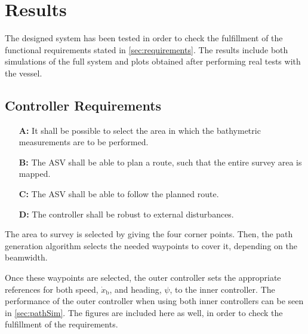 \chapter{Results}\label{chap:results}
The designed system has been tested in order to check the fulfillment of the functional requirements stated in \autoref{sec:requirements}. The results include both simulations of the full system and plots obtained after performing real tests with the vessel.

\section{Controller Requirements}
\begin{itemize}
  \item[\textbf{A:}] It shall be possible to select the area in which the bathymetric measurements are to be performed.
  \item[\textbf{B:}] The ASV shall be able to plan a route, such that the entire survey area is mapped.
  \item[\textbf{C:}] The ASV shall be able to follow the planned route.
  \item[\textbf{D:}] The controller shall be robust to external disturbances.
\end{itemize}

The area to survey is selected by giving the four corner points. Then, the path generation algorithm selects the needed waypoints to cover it, depending on the beamwidth.

Once these waypoints are selected, the outer controller sets the appropriate references for both speed, $\dot{x}_\mathrm{b}$, and heading, $\psi$, to the inner controller. The performance of the outer controller when using both inner controllers can be seen in \autoref{sec:pathSim}. The figures are included here as well, in order to check the fulfillment of the requirements.

